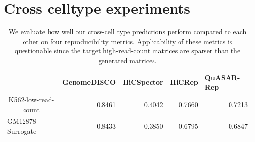 \section{Cross celltype experiments}
\label{supp-section:cross-celltype-experiments}

\begin{table}[H]
\centering
\begin{tabular}{lrrrr}
\textbf{} & \multicolumn{1}{c}{\textbf{GenomeDISCO}} & \multicolumn{1}{l}{\textbf{HiCSpector}} & \multicolumn{1}{l}{\textbf{HiCRep}} & \multicolumn{1}{l}{\textbf{QuASAR-Rep}} \\ \hline
\multicolumn{1}{c}{K562-low-read-count} & 0.8461 & 0.4042 & 0.7660 & 0.7213 \\
GM12878-Surrogate & 0.8433 & 0.3850 & 0.6795 & 0.6847 \\ \hline
\end{tabular}
\caption{
    \label{supp-tab:cross-celltype-eval} We evaluate how well our cross-cell type predictions perform compared to each other on four reproducibility metrics. Applicability of these metrics is questionable since the target high-read-count matrices are sparser than the generated matrices. 
}
\end{table}



